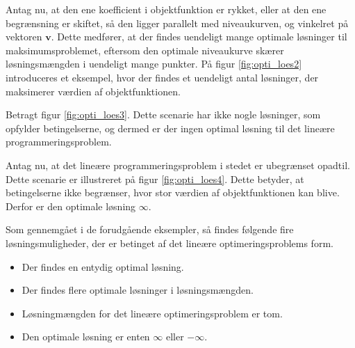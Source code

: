 Antag nu, at den ene koefficient i objektfunktion er rykket, eller at den ene begrænsning er skiftet, så den ligger parallelt med niveaukurven, og vinkelret på vektoren $\textbf{v}$.
Dette medfører, at der findes uendeligt mange optimale løsninger til maksimumsproblemet, eftersom den optimale niveaukurve skærer løsningsmængden i uendeligt mange punkter.
På figur \ref{fig:opti_loes2} introduceres et eksempel, hvor der findes et uendeligt antal løsninger, der
maksimerer værdien af objektfunktionen. 
%

%
\noindent
%
Betragt figur \ref{fig:opti_loes3}.
Dette scenarie har ikke nogle løsninger, som opfylder betingelserne, og dermed er der ingen optimal løsning til det lineære programmeringsproblem. 
%

%
\noindent
%
Antag nu, at det lineære programmeringsproblem i stedet er ubegrænset opadtil.
Dette scenarie er illustreret på figur \ref{fig:opti_loes4}.
%
Dette betyder, at betingelserne ikke begrænser, hvor stor
værdien af objektfunktionen kan blive. 
Derfor er den optimale løsning $\infty$.
%

%
\noindent
%
Som gennemgået i de forudgående eksempler, så findes følgende fire løsningsmuligheder, der er betinget af det lineære optimeringsproblems form.
%
\begin{itemize}
\item Der findes en entydig optimal løsning.
\item Der findes flere optimale løsninger i løsningsmængden.
\item Løsningmængden for det lineære optimeringsproblem er tom. 
\item Den optimale løsning er enten $\infty$ eller $-\infty$.
\end{itemize}
%